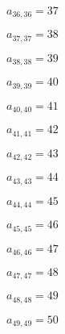 \documentclass[a4paper,12pt]{article}
\begin{document}
$a _{ 36, 36 } = 37$

$a _{ 37, 37 } = 38$

$a _{ 38, 38 } = 39$

$a _{ 39, 39 } = 40$

$a _{ 40, 40 } = 41$

$a _{ 41, 41 } = 42$

$a _{ 42, 42 } = 43$

$a _{ 43, 43 } = 44$

$a _{ 44, 44 } = 45$

$a _{ 45, 45 } = 46$

$a _{ 46, 46 } = 47$

$a _{ 47, 47 } = 48$

$a _{ 48, 48 } = 49$

$a _{ 49, 49 } = 50$
\end{document}

